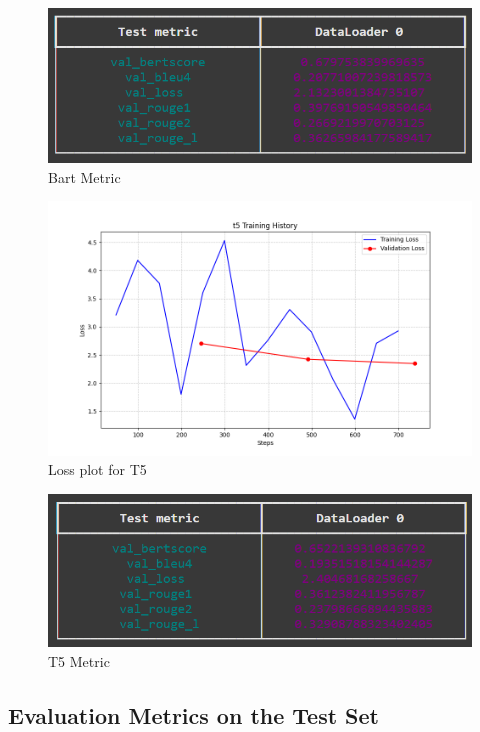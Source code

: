 \documentclass{article}
\begin{document}
\begin{figure}[H]
    \centering
    \includegraphics[width=1\textwidth]{bart_metric.png}
    \caption{Bart Metric}
    \label{fig:Fig1}
\end{figure}


\begin{figure}[H]
    \centering
    \includegraphics[width=1\textwidth]{t5_loss.png}
    \caption{Loss plot for T5}
    \label{fig:Fig1}
\end{figure}

\begin{figure}[H]
    \centering
    \includegraphics[width=1\textwidth]{t5_metric.png}
    \caption{T5 Metric}
    \label{fig:Fig1}
\end{figure}


\subsection{Evaluation Metrics on the Test Set}
\end{document}
